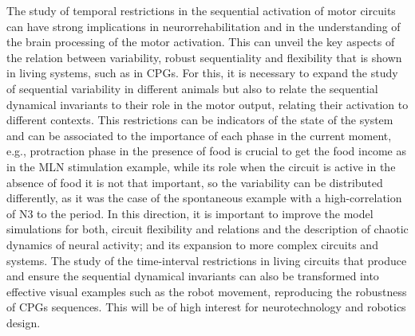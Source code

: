 The study of temporal restrictions in the sequential activation of motor circuits can have strong implications in neurorrehabilitation and in the understanding of the brain processing of the motor activation. This can unveil the key aspects of the relation between variability, robust sequentiality and flexibility that is shown in living systems, such as in CPGs. For this, it is necessary to expand the study of sequential variability in different animals but also to relate the sequential dynamical invariants to their role in the motor output, relating their activation to different contexts. This restrictions can be indicators of the state of the system and can be associated to the importance of each phase in the current moment, e.g., protraction phase in the presence of food is crucial to get the food income as in the MLN stimulation example, while its role when the circuit is active in the absence of food it is not that important, so the variability can be distributed differently, as it was the case of the spontaneous example with a high-correlation of N3 to the period. In this direction, it is important to improve the model simulations for both, circuit flexibility and relations and the description of chaotic dynamics of neural activity; and its expansion to more complex circuits and systems. The study of the time-interval restrictions in living circuits that produce and ensure the sequential dynamical invariants can also  be transformed into effective visual examples such as the robot movement, reproducing the robustness of CPGs sequences. This will be of high interest for neurotechnology and robotics design. 

